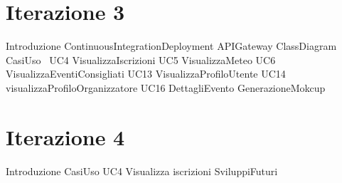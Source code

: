 \documentclass[a4paper, 12pt]{book}
\begin{document}
\chapter{Iterazione 3}
{Introduzione}
\clearpage
{ContinuousIntegrationDeployment}
\clearpage
{APIGateway}
\clearpage
{ClassDiagram}
\clearpage
{CasiUso}
\clearpage\
{UC4 VisualizzaIscrizioni}
\clearpage
{UC5 VisualizzaMeteo}
\clearpage
{UC6 VisualizzaEventiConsigliati}
\clearpage
{UC13 VisualizzaProfiloUtente}
\clearpage
{UC14 visualizzaProfiloOrganizzatore}
\clearpage
{UC16 DettagliEvento}
\clearpage
{GenerazioneMokcup}
\clearpage

\chapter{Iterazione 4}
{Introduzione}
\clearpage
{CasiUso}
\clearpage
{UC4 Visualizza iscrizioni}
\clearpage
{SviluppiFuturi}
\clearpage
\end{document}
